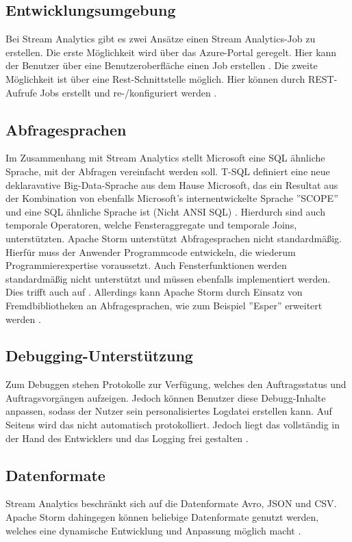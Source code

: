 \subsection{Entwicklungsumgebung}
Bei Stream Analytics gibt es zwei Ansätze einen Stream Analytics-Job zu erstellen. Die erste Möglichkeit wird über das Azure-Portal geregelt. Hier kann der Benutzer über eine Benutzeroberfläche einen Job erstellen \cite{jeffstokes72.19.12.2017}. Die zweite Möglichkeit ist über eine Rest-Schnittstelle möglich. Hier können durch REST-Aufrufe Jobs erstellt und re-/konfiguriert werden \cite{samacha.19.12.2017}. 

\subsection{Abfragesprachen} \label{absprache}
Im Zusammenhang mit Stream Analytics stellt Microsoft eine SQL ähnliche Sprache, mit der Abfragen vereinfacht werden soll. T-SQL definiert eine neue deklaravative Big-Data-Sprache aus dem Hause Microsoft, das ein Resultat aus der Kombination von ebenfalls Microsoft’s internentwickelte Sprache ''SCOPE'' und eine SQL ähnliche Sprache ist (Nicht ANSI SQL) \cite{sql.2016}. Hierdurch sind auch temporale Operatoren, welche Fensteraggregate und temporale Joins, unterstützten. Apache Storm unterstützt Abfragesprachen nicht standardmäßig. Hierfür muss der Anwender Programmcode entwickeln, die wiederum Programmierexpertise voraussetzt. Auch Fensterfunktionen werden standardmäßig nicht unterstützt und müssen ebenfalls implementiert werden. Dies trifft auch auf  \cite{samacha.2017}. Allerdings kann Apache Storm durch Einsatz von Fremdbibliotheken an Abfragesprachen, wie zum Beispiel ''Esper'' erweitert werden \cite{esper.2016}.

\subsection{Debugging-Unterstützung} \label{Debugging}
Zum Debuggen stehen Protokolle zur Verfügung, welches den Auftragsstatus und Auftragsvorgängen aufzeigen. Jedoch können Benutzer diese Debugg-Inhalte anpassen, sodass der Nutzer sein personalisiertes Logdatei erstellen kann. Auf Seitens wird das nicht automatisch protokolliert. Jedoch liegt das vollständig in der Hand des Entwicklers und das Logging frei gestalten \cite{apachedebugging.2106}.


\subsection{Datenformate}
Stream Analytics beschränkt sich auf die Datenformate Avro, JSON und CSV. Apache Storm dahingegen können beliebige Datenformate genutzt werden, welches eine dynamische Entwicklung und Anpassung möglich macht \cite{Klein.2017}. 

